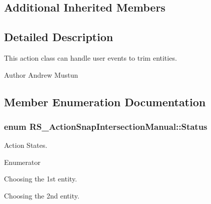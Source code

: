 \subsection*{Additional Inherited Members}


\subsection{Detailed Description}
This action class can handle user events to trim entities.

\begin{DoxyAuthor}{Author}
Andrew Mustun 
\end{DoxyAuthor}


\subsection{Member Enumeration Documentation}
\hypertarget{classRS__ActionSnapIntersectionManual_a2bc96661161c306e870325c2e9ff0846}{
\subsubsection[{Status}]{\setlength{\rightskip}{0pt plus 5cm}enum {\bf R\-S\-\_\-\-Action\-Snap\-Intersection\-Manual\-::\-Status}}}\label{classRS__ActionSnapIntersectionManual_a2bc96661161c306e870325c2e9ff0846}
Action States. \begin{Desc}
\item[Enumerator]\par
\begin{description}
\item[{\em 
\hypertarget{classRS__ActionSnapIntersectionManual_a2bc96661161c306e870325c2e9ff0846acb083c57ed735509c64a78a0b566608d}{Choose\-Entity1}\label{classRS__ActionSnapIntersectionManual_a2bc96661161c306e870325c2e9ff0846acb083c57ed735509c64a78a0b566608d}
}]Choosing the 1st entity. \item[{\em 
\hypertarget{classRS__ActionSnapIntersectionManual_a2bc96661161c306e870325c2e9ff0846a0e864c5fe9fda3772c52460bc1412494}{Choose\-Entity2}\label{classRS__ActionSnapIntersectionManual_a2bc96661161c306e870325c2e9ff0846a0e864c5fe9fda3772c52460bc1412494}
}]Choosing the 2nd entity. \end{description}
\end{Desc}


